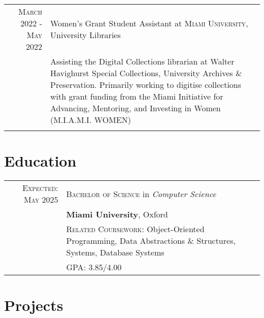 \documentclass[letterpaper,10pt]{article} %
\begin{document}
{\begin{tabular}{r|p{11cm}}

\textsc{March 2022 - May 2022} & Women's Grant Student Assistant at \textsc{Miami University}, University Libraries \emph{}\\
& \footnotesize{Assisting the Digital Collections librarian at Walter Havighurst Special Collections, University Archives \& Preservation.
Primarily working to digitise collections with grant funding from the Miami Initiative for Advancing, Mentoring, and Investing in Women (M.I.A.M.I. WOMEN)}\\
\multicolumn{2}{c}{} \\
\end{tabular}\normalsize


\section{Education}

\begin{tabular}{rl}	
\textsc{Expected: May 2025} & \textsc{Bachelor of Science} in \emph{Computer Science}\\ &
\textbf{Miami University}, Oxford\\ &
\footnotesize \textsc{Related Coursework:} Object-Oriented Programming, Data Abstractions \& Structures, Systems, Database Systems\\&
\footnotesize \textsc{GPA}: 3.85/4.00\normalsize \\


\end{tabular}


\section{Projects}

}
\end{document}
